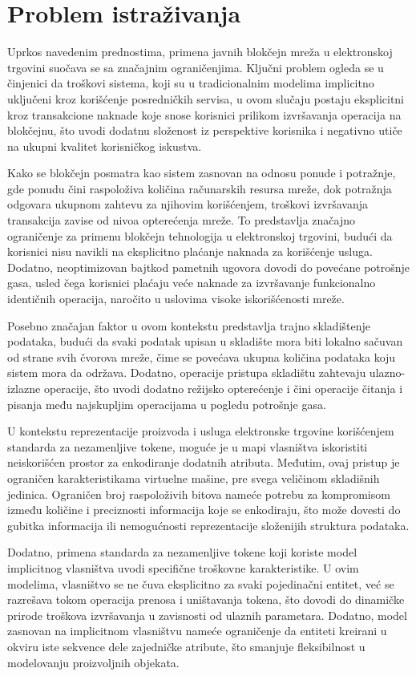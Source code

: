 \section{Problem istraživanja}
Uprkos navedenim prednostima, primena javnih blokčejn mreža u elektronskoj trgovini suočava se sa značajnim ograničenjima. Ključni problem ogleda se u činjenici da troškovi sistema, koji su u tradicionalnim modelima implicitno uključeni kroz korišćenje posredničkih servisa, u ovom slučaju postaju eksplicitni kroz transakcione naknade koje snose korisnici prilikom izvršavanja operacija na blokčejnu, što uvodi dodatnu složenost iz perspektive korisnika i negativno utiče na ukupni kvalitet korisničkog iskustva.

Kako se blokčejn posmatra kao sistem zasnovan na odnosu ponude i potražnje, gde ponudu čini raspoloživa količina računarskih resursa mreže, dok potražnja odgovara ukupnom zahtevu za njihovim korišćenjem, troškovi izvršavanja transakcija zavise od nivoa opterećenja mreže. To predstavlja značajno ograničenje za primenu blokčejn tehnologija u elektronskoj trgovini, budući da korisnici nisu navikli na eksplicitno plaćanje naknada za korišćenje usluga. Dodatno, neoptimizovan bajtkod pametnih ugovora dovodi do povećane potrošnje gasa, usled čega korisnici plaćaju veće naknade za izvršavanje funkcionalno identičnih operacija, naročito u uslovima visoke iskorišćenosti mreže.

Posebno značajan faktor u ovom kontekstu predstavlja trajno skladištenje podataka, budući da svaki podatak upisan u skladište mora biti lokalno sačuvan od strane svih čvorova mreže, čime se povećava ukupna količina podataka koju sistem mora da održava. Dodatno, operacije pristupa skladištu zahtevaju ulazno-izlazne operacije, što uvodi dodatno režijsko opterećenje i čini operacije čitanja i pisanja među najskupljim operacijama u pogledu potrošnje gasa.

U kontekstu reprezentacije proizvoda i usluga elektronske trgovine korišćenjem standarda za nezamenljive tokene, moguće je u mapi vlasništva iskoristiti neiskorišćen prostor za enkodiranje dodatnih atributa. Međutim, ovaj pristup je ograničen karakteristikama virtuelne mašine, pre svega veličinom skladišnih jedinica. Ograničen broj raspoloživih bitova nameće potrebu za kompromisom između količine i preciznosti informacija koje se enkodiraju, što može dovesti do gubitka informacija ili nemogućnosti reprezentacije složenijih struktura podataka.

Dodatno, primena standarda za nezamenljive tokene koji koriste model implicitnog vlasništva uvodi specifične troškovne karakteristike. U ovim modelima, vlasništvo se ne čuva eksplicitno za svaki pojedinačni entitet, već se razrešava tokom operacija prenosa i uništavanja tokena, što dovodi do dinamičke prirode troškova izvršavanja u zavisnosti od ulaznih parametara. Dodatno, model zasnovan na implicitnom vlasništvu nameće ograničenje da entiteti kreirani u okviru iste sekvence dele zajedničke atribute, što smanjuje fleksibilnost u modelovanju proizvoljnih objekata.

